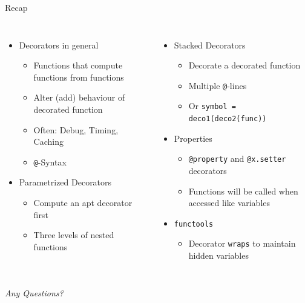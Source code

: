 
\begin{frame}[t,plain]
\titlepage
\end{frame}


\begin{frame}{Recap}
%
\begin{columns}[T]
\begin{itemize}
\item Decorators in general
	\begin{itemize}
	\item Functions that compute functions from functions
	\item Alter (add) behaviour of decorated function
	\item Often: Debug, Timing, Caching
	\item \texttt{@}-Syntax
	\end{itemize}
\item Parametrized Decorators
	\begin{itemize}
	\item Compute an apt decorator first
	\item Three levels of nested functions
	\end{itemize}
\end{itemize}
%
\begin{itemize}
\item Stacked Decorators
	\begin{itemize}
	\item Decorate a decorated function
	\item Multiple \texttt{@}-lines
	\item Or \texttt{symbol = deco1(deco2(func))}
	\end{itemize}
\item Properties
	\begin{itemize}
	\item \texttt{@property} and \texttt{@x.setter} decorators
	\item Functions will be called when accessed like variables
	\end{itemize}
\item \texttt{functools}
	\begin{itemize}
	\item Decorator \texttt{wraps} to maintain hidden variables
	\end{itemize}
\end{itemize}

\end{columns}
%
\begin{center}
	\emph{Any Questions?}
\end{center}
%
\end{frame}

